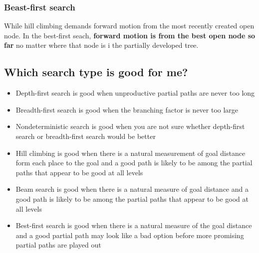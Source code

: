 \subsubsection{Beast-first search}

While hill climbing demands forward motion from the most recently created
open node. In the best-first seach, \textbf{forward motion is 
from the best open node so far} no matter where that node is i the
partially developed tree.

\subsection{Which search type is good for me?}
\begin{itemize}
  \item Depth-first search is good when unproductive partial
    paths are never too long
  \item Breadth-first search is good when the branching 
    factor is never too large
  \item Nondeterministic search is good when you are not sure whether
    depth-first search or breadth-first search would be better
  \item Hill climbing is good when there is a natural measurement
    of goal distance form each place to the goal and a good path is 
    likely to be among the partial paths that appear to be good at
    all levels
  \item Beam search is good when there is a natural measure of
    goal distance and a good path is likely to be among the 
    partial paths that appear to be good at all levels
  \item Best-first search is good when there is a natural measure 
    of the goal distance and a good partial path may look like
    a bad option before more promising partial paths are played
    out
\end{itemize}

